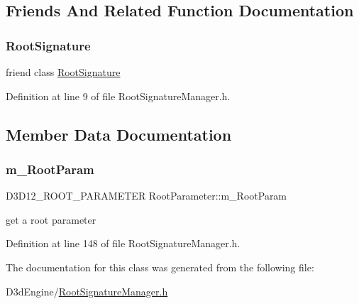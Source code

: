 \subsection{Friends And Related Function Documentation}
\mbox{\label{class_root_parameter_a7e2ac7a0f943c9d42c25946d63339943}} 
\subsubsection{\texorpdfstring{Root\+Signature}{RootSignature}}
{\footnotesize\ttfamily friend class \mbox{\hyperlink{class_root_signature}{Root\+Signature}}\hspace{0.3cm}{\ttfamily [friend]}}



Definition at line 9 of file Root\+Signature\+Manager.\+h.



\subsection{Member Data Documentation}
\mbox{\label{class_root_parameter_a66f26d4bb3cd092c625bc083c508fe40}} 
\subsubsection{\texorpdfstring{m\+\_\+\+Root\+Param}{m\_RootParam}}
{\footnotesize\ttfamily D3\+D12\+\_\+\+R\+O\+O\+T\+\_\+\+P\+A\+R\+A\+M\+E\+T\+ER Root\+Parameter\+::m\+\_\+\+Root\+Param\hspace{0.3cm}{\ttfamily [protected]}}



get a root parameter 



Definition at line 148 of file Root\+Signature\+Manager.\+h.



The documentation for this class was generated from the following file\+:\begin{DoxyCompactItemize}
\item 
D3d\+Engine/\mbox{\hyperlink{_root_signature_manager_8h}{Root\+Signature\+Manager.\+h}}\end{DoxyCompactItemize}
